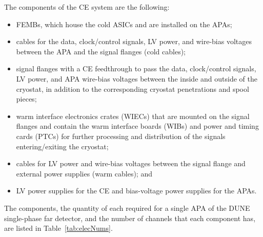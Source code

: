 The components of the CE system are the following:
\begin{itemize}
\item{FEMBs, which house the cold ASICs and are installed on the
APAs;}
\item{cables for the data, clock/control signals, LV power, and wire-bias voltages between the APA and the signal flanges (cold cables);}
\item{signal flanges with a CE feedthrough to pass the data, clock/control signals, LV power, and APA wire-bias voltages between the inside and outside of the cryostat, in addition to the corresponding cryostat penetrations and spool pieces;}
\item{warm interface electronics crates (WIECs) that are mounted on the signal flanges and contain
the warm interface boards (WIBs) and power and timing cards (PTCs) for further processing
and distribution of the signals entering/exiting the cryostat;}
\item{cables for LV power and wire-bias voltages between the signal flange and external power
supplies (warm cables); and}
\item{LV power supplies for the CE and bias-voltage power supplies for the APAs.}
\end{itemize}

The components, the quantity of each required for a single APA of the DUNE single-phase far detector, and the number of channels that each component has, are listed in Table~\ref{tab:elecNums}.

